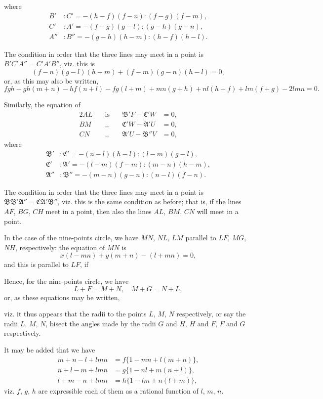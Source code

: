 \documentclass[11pt,a4paper]{book}
\begin{document}
\noindent
where
\begin{align*}
B' &: C' = -(h-f)(f-n) : (f-g)(f-m),\\
C' &: A' = -(f-g)(g-l) : (g-h)(g-n),\\
A'' &: B'' = -(g-h)(h-m) : (h-f)(h-l).
\end{align*}

The condition in order that the three lines may meet in a point is
$B'C'A'' = C'A'B''$, viz. this is
\[
(f-n)(g-l)(h-m) + (f-m)(g-n)(h-l) = 0,
\]
or, as this may also be written,
\[
fgh - gh(m+n) - hf(n+l) - fg(l+m) + mn(g+h) + nl(h+f) + lm(f+g) - 2lmn = 0.
\]

Similarly, the equation of
\begin{alignat*}{2}
AL &\quad \text{is} \quad & \mathfrak{B}'F - \mathfrak{C}'W &= 0,\\
BM &\quad \text{,,} \quad & \mathfrak{C}'W - \mathfrak{A}'U &= 0,\\
CN &\quad \text{,,} \quad & \mathfrak{A}'U - \mathfrak{B}''V &= 0,
\end{alignat*}
where
\begin{align*}
\mathfrak{B}' &: \mathfrak{C}' = -(n-l)(h-l) : (l-m)(g-l),\\
\mathfrak{C}' &: \mathfrak{A}' = -(l-m)(f-m) : (m-n)(h-m),\\
\mathfrak{A}'' &: \mathfrak{B}'' = -(m-n)(g-n) : (n-l)(f-n).
\end{align*}

The condition in order that the three lines may meet in a point is
$\mathfrak{B}\mathfrak{B}'\mathfrak{A}'' = \mathfrak{C}\mathfrak{A}'\mathfrak{B}''$, viz. this is the same condition as before; that is, if the lines $AF$, $BG$, $CH$ meet in a point, then also the lines $AL$, $BM$, $CN$ will meet in a point.

In the case of the nine-points circle, we have $MN$, $NL$, $LM$ parallel to $LF$, $MG$, $NH$, respectively: the equation of $MN$ is
\[
x(l-mn) + y(m+n) - (l+mn) = 0,
\]
and this is parallel to $LF$, if \dotfill

Hence, for the nine-points circle, we have
\[
L+F = M+N, \quad M+G = N+L,
\]
or, as these equations may be written, \dotfill

viz. it thus appears that the radii to the points $L$, $M$, $N$ respectively, or say the radii $L$, $M$, $N$, bisect the angles made by the radii $G$ and $H$, $H$ and $F$, $F$ and $G$ respectively.

It may be added that we have
\begin{align*}
m+n-l+lmn &= f\{1-mn+l(m+n)\},\\
n+l-m+lmn &= g\{1-nl+m(n+l)\},\\
l+m-n+lmn &= h\{1-lm+n(l+m)\},
\end{align*}
viz. $f$, $g$, $h$ are expressible each of them as a rational function of $l$, $m$, $n$.
\end{document}
